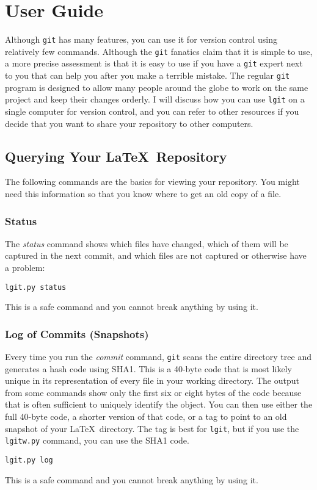 \documentclass{ltxdoc}
\def\ucmd#1{{\tt {#1}}}
\begin{document}
\section{User Guide}
\label{usrguide}Although \ucmd{git} has many features, you can use it for version control using relatively few commands.  Although the \ucmd{git} fanatics claim that it is simple to use, a more precise assessment is that it is easy to use if you have a \ucmd{git} expert next to you that can help you after you make a terrible mistake.  The regular \ucmd{git} program is designed to allow many people around the globe to work on the same project and keep their changes orderly.  I will discuss how you can use \ucmd{lgit} on a single computer for version control, and you can refer to other resources if you decide that you want to share your repository to other computers.


\subsection{Querying Your \LaTeX\ Repository}
The following commands are the basics for viewing your repository.  You might need this information so that you know where to get an old copy of a file.
\subsubsection{Status}
The \emph{status} command shows which files have changed, which of them will be captured in the next commit, and which files are not captured or otherwise have a problem:
\begin{verbatim}
lgit.py status
\end{verbatim}
This is a safe command and you cannot break anything by using it.
\subsubsection{Log of Commits (Snapshots)}
Every time you run the \emph{commit} command, \ucmd{git} scans the entire directory tree and generates a hash code using SHA1.  This is a 40-byte code that is most likely unique in its representation of every file in your working directory.  The output from some commands show only the first six or eight bytes of the code because that is often sufficient to uniquely identify the object.  You can then use either the full 40-byte code, a shorter version of that code, or a tag to point to an old snapshot of your \LaTeX\ directory. The tag is best for \ucmd{lgit}, but if you use the \ucmd{lgitw.py} command, you can use the SHA1 code.
\begin{verbatim}
lgit.py log
\end{verbatim}
This is a safe command and you cannot break anything by using it.
\end{document}
